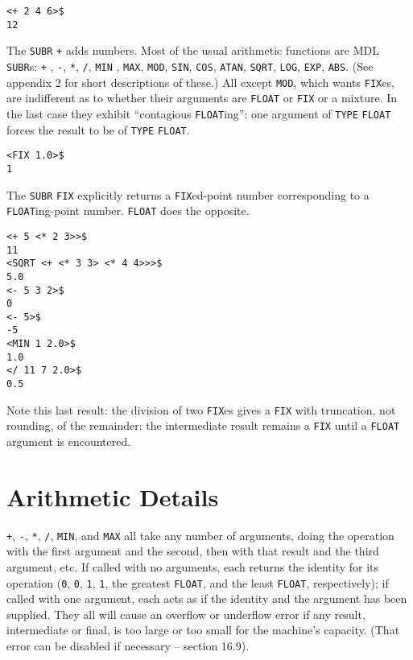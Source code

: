 \documentclass[a4paper]{scrbook}
\begin{document}
\begin{verbatim}
<+ 2 4 6>$
12
\end{verbatim}

The \texttt{SUBR} \texttt{+} adds numbers. Most of the usual arithmetic functions are MDL \texttt{SUBR}s: \texttt{+}
,  \texttt{-}, \texttt{*}, 
\texttt{/}, \texttt{MIN} , \texttt{MAX},
\texttt{MOD}, \texttt{SIN}, \texttt{COS},
\texttt{ATAN}, \texttt{SQRT}, \texttt{LOG},
\texttt{EXP}, \texttt{ABS}. (See appendix 2 for short descriptions of
these.) All except \texttt{MOD}, which wants \texttt{FIX}es, are indifferent as to whether their
arguments are \texttt{FLOAT} or \texttt{FIX} or a mixture. In the last case they exhibit ``contagious \texttt{FLOAT}ing'':
one argument of \texttt{TYPE} \texttt{FLOAT} forces the result to be of \texttt{TYPE} \texttt{FLOAT}.

\begin{verbatim}
<FIX 1.0>$
1
\end{verbatim}

The \texttt{SUBR} \texttt{FIX} explicitly returns a \texttt{FIX}ed-point number corresponding to a \texttt{FLOAT}ing-point
number. \texttt{FLOAT} does the opposite.

\begin{verbatim}
<+ 5 <* 2 3>>$
11
<SQRT <+ <* 3 3> <* 4 4>>>$
5.0
<- 5 3 2>$
0
<- 5>$
-5
<MIN 1 2.0>$
1.0
</ 11 7 2.0>$
0.5
\end{verbatim}

Note this last result: the division of two \texttt{FIX}es gives a \texttt{FIX} with truncation, not rounding, of the
remainder: the intermediate result remains a \texttt{FIX} until a \texttt{FLOAT} argument is encountered.

\section{Arithmetic Details}\label{arithmetic-details}

\texttt{+}, \texttt{-}, \texttt{*}, \texttt{/}, \texttt{MIN}, and \texttt{MAX} all take any number of arguments, doing the
operation with the first argument and the second, then with that result and the third argument, etc. If called with no
arguments, each returns the identity for its operation (\texttt{0}, \texttt{0}, \texttt{1}, \texttt{1}, the greatest
\texttt{FLOAT}, and the least \texttt{FLOAT}, respectively); if called with one argument, each acts as if the identity and
the argument has been supplied. They all will cause an overflow or underflow error if any result, intermediate or final, is
too large or too small for the machine's capacity. (That error can be disabled if necessary -- section 16.9).
\end{document}
